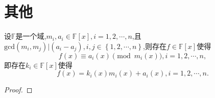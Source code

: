 \documentclass[../../main.tex]{subfiles}
\begin{document}
\section{其他}

\begin{theorem}\label{theorem:中国剩余定理推广(模不互质的情况)}
设$\mathbb{F}$是一个域,$m_i,a_i\in \mathbb{F}[x],i=1,2,\cdots,n$,且$\mathrm{gcd}\left( m_i,m_j \right) |\left( a_i-a_j \right) ,i,j\in \left\{ 1,2,\cdots ,n \right\}$,则存在$f\in\mathbb{F}[x]$使得
$$
f(x)\equiv a_i(x)\pmod{m_i(x)},i=1,2,\cdots,n,
$$
即存在$k_i\in\mathbb{F}[x]$使得
$$
f(x)=k_i(x)m_i(x)+a_i(x),i=1,2,\cdots,n.
$$
\end{theorem}
\begin{proof}


\end{proof}
\end{document}
